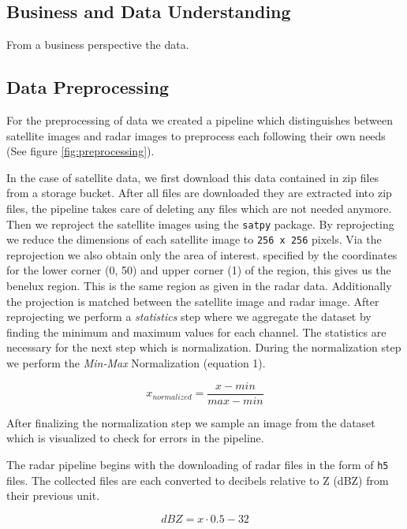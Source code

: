 \documentclass[acmtog, authorversion]{acmart}
\begin{document}
\subsection{Business and Data Understanding}
From a business perspective the data.

\subsection{Data Preprocessing}

For the preprocessing of data we created a pipeline which distinguishes between satellite images and radar images to preprocess each following their own needs (See figure \ref{fig:preprocessing}).

In the case of satellite data, we first download this data contained in zip files from a storage bucket. After all files are downloaded they are extracted into zip files, the pipeline takes care of deleting any files which are not needed anymore.
Then we reproject the satellite images using the \texttt{satpy} package. By reprojecting we reduce the dimensions of each satellite image to \texttt{256 x 256} pixels.
Via the reprojection we also obtain only the area of interest. specified by the coordinates for the lower corner (0, 50) and upper corner (1) of the region, this gives us the benelux region. This is the same region as given in the radar data.
Additionally the projection is matched between the satellite image and radar image.
After reprojecting we perform a \textit{statistics} step where we aggregate the dataset by finding the minimum and maximum values for each channel.
The statistics are necessary for the next step which is normalization. During the normalization step we perform the \textit{Min-Max} Normalization (equation 1).

\begin{equation}
  x_{normalized} = \frac{x-min}{max-min}  
\end{equation}

After finalizing the normalization step we sample an image from the dataset which is visualized to check for errors in the pipeline.

The radar pipeline begins with the downloading of radar files in the form of \texttt{h5} files. The collected files are each converted to decibels relative to Z (dBZ) from their previous unit.

\begin{equation}
  dBZ = x \cdot 0.5 - 32
\end{equation}
\end{document}
